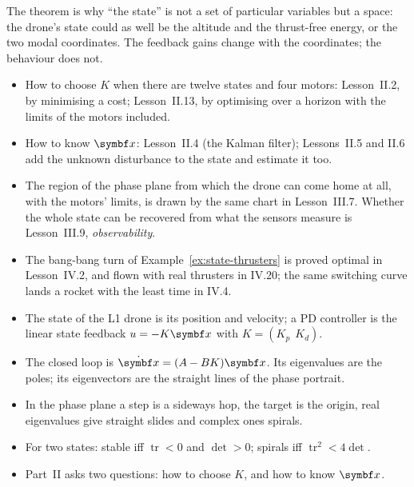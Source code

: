 The theorem is why \enquote{the state} is not a set of particular variables but a space: the drone's state could as well be the altitude and the thrust-free energy, or the two modal coordinates. The feedback gains change with the coordinates; the behaviour does not.

\begin{lookahead}
\begin{itemize}[leftmargin=1.2em]
  \item How to choose $K$ when there are twelve states and four motors: Lesson~II.2, by minimising a cost; Lesson~II.13, by optimising over a horizon with the limits of the motors included.
  \item How to know $\vx$: Lesson~II.4 (the Kalman filter); Lessons~II.5 and II.6 add the unknown disturbance to the state and estimate it too.
  \item The region of the phase plane from which the drone can come home at all, with the motors' limits, is drawn by the same chart in Lesson~III.7. Whether the whole state can be recovered from what the sensors measure is Lesson~III.9, \emph{observability}.
  \item The bang-bang turn of Example~\ref{ex:state-thrusters} is proved optimal in Lesson~IV.2, and flown with real thrusters in IV.20; the same switching curve lands a rocket with the least time in IV.4.
\end{itemize}
\end{lookahead}

\begin{remember}
\begin{itemize}
  \item The state of the L1 drone is its position and velocity; a PD controller is the linear state feedback $u = -K\vx$ with $K = (K_p\ \ K_d)$.
  \item The closed loop is $\dot{\vx} = (A - BK)\vx$. Its eigenvalues are the poles; its eigenvectors are the straight lines of the phase portrait.
  \item In the phase plane a step is a sideways hop, the target is the origin, real eigenvalues give straight slides and complex ones spirals.
  \item For two states: stable iff $\operatorname{tr} < 0$ and $\det > 0$; spirals iff $\operatorname{tr}^2 < 4\det$.
  \item Part~II asks two questions: how to choose $K$, and how to know $\vx$.
\end{itemize}
\end{remember}

